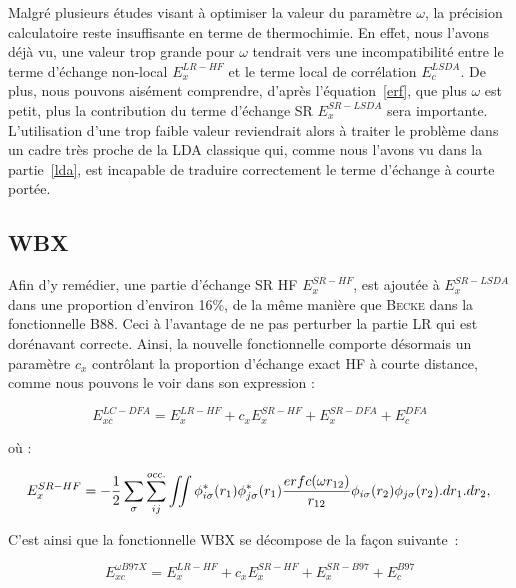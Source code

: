{{Malgré plusieurs études visant à optimiser la valeur du paramètre $\omega$, la précision calculatoire reste insuffisante en terme de thermochimie. En effet, nous l'avons déjà vu, une valeur trop grande pour $\omega$ tendrait vers une incompatibilité entre le terme d'échange non-local $E_{x}^{LR-HF}$ et le terme local de corrélation $E_{c}^{LSDA}$. De plus, nous pouvons aisément comprendre, d'après l'équation~\ref{erf}, que plus $\omega$ est petit, plus la contribution du terme d'échange SR $E_{x}^{SR-LSDA}$ sera importante. L'utilisation d'une trop faible valeur  reviendrait alors à traiter le problème dans un cadre très proche de la LDA classique qui, comme nous l'avons vu dans la partie~\ref{lda}, est incapable de traduire correctement le terme d'échange à courte portée.

\subsection{WBX}

Afin d'y remédier, une partie d'échange SR HF $E_{x}^{SR-HF}$, est ajoutée à $E_{x}^{SR-LSDA}$ dans une proportion d'environ 16\%,  de la même manière que \textsc{Becke} dans la fonctionnelle B88. Ceci à l'avantage de ne pas perturber la partie LR qui est dorénavant correcte. Ainsi, la nouvelle fonctionnelle comporte désormais un paramètre $c_{x}$ contrôlant la proportion d'échange exact HF à courte distance, comme nous pouvons le voir dans son expression :

\begin{equation}
E_{xc}^{LC-DFA} = E_{x}^{LR-HF} + c_{x}E_{x}^{SR-HF} + E_{x}^{SR-DFA} + E_{c}^{DFA}
\end{equation}

\noindent où :

\begin{equation}
E_{x}^{SR-HF} = -\frac{1}{2} \sum_{\sigma} \sum_{ij}^{occ.} \iint \phi_{i \sigma}^{*}(r_{1}) \phi_{j \sigma}^{*}(r_{1}) \frac{erfc(\omega r_{12})}{r_{12}} \phi_{i \sigma}(r_{2}) \phi_{j \sigma}(r_{2}).dr_{1}.dr_{2}, \\
\end{equation}

C'est ainsi que la fonctionnelle WBX\cite{WB97X} se décompose de la façon suivante~:

\begin{equation}
E_{xc}^{\omega B97X} = E_{x}^{LR-HF} + c_{x}E_{x}^{SR-HF} + E_{x}^{SR-B97} + E_{c}^{B97}
\end{equation}

}}
